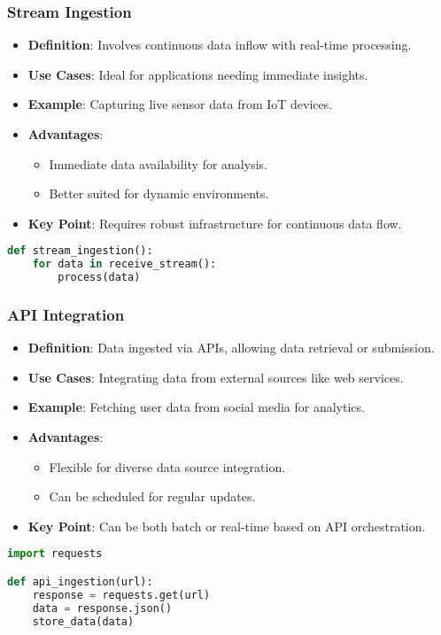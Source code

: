 \documentclass[aspectratio=169]{beamer}
\begin{document}
\begin{frame}[fragile]
    \frametitle{Stream Ingestion}
    \begin{itemize}
        \item \textbf{Definition}: Involves continuous data inflow with real-time processing.
        \item \textbf{Use Cases}: Ideal for applications needing immediate insights.
        \item \textbf{Example}: Capturing live sensor data from IoT devices.
        \item \textbf{Advantages}:
            \begin{itemize}
                \item Immediate data availability for analysis.
                \item Better suited for dynamic environments.
            \end{itemize}
        \item \textbf{Key Point}: Requires robust infrastructure for continuous data flow.
    \end{itemize}
    \begin{lstlisting}[language=Python]
def stream_ingestion():
    for data in receive_stream():
        process(data)
    \end{lstlisting}
\end{frame}

\begin{frame}[fragile]
    \frametitle{API Integration}
    \begin{itemize}
        \item \textbf{Definition}: Data ingested via APIs, allowing data retrieval or submission.
        \item \textbf{Use Cases}: Integrating data from external sources like web services.
        \item \textbf{Example}: Fetching user data from social media for analytics.
        \item \textbf{Advantages}:
            \begin{itemize}
                \item Flexible for diverse data source integration.
                \item Can be scheduled for regular updates.
            \end{itemize}
        \item \textbf{Key Point}: Can be both batch or real-time based on API orchestration.
    \end{itemize}
    \begin{lstlisting}[language=Python]
import requests

def api_ingestion(url):
    response = requests.get(url)
    data = response.json()
    store_data(data)
    \end{lstlisting}
\end{frame}
\end{document}
